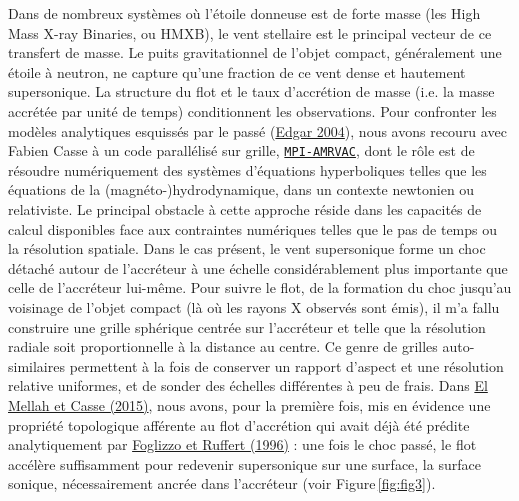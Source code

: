 \documentclass[a4paper,12pt,onecolumn]{article}
\begin{document}
\indent \indent Dans de nombreux systèmes où l'étoile donneuse est de forte masse (les High Mass X-ray Binaries, ou HMXB), le vent stellaire est le principal vecteur de ce transfert de masse. Le puits gravitationnel de l'objet compact, généralement une étoile à neutron, ne capture qu'une fraction de ce vent dense et hautement supersonique. La structure du flot et le taux d'accrétion de masse (i.e. la masse accrétée par unité de temps) conditionnent les observations. Pour confronter les modèles analytiques esquissés par le passé (\href{http://www.sciencedirect.com/science/article/pii/S1387647304000739}{Edgar 2004}), nous avons recouru avec Fabien Casse à un code parallélisé sur grille, \href{http://amrvac.org/}{\texttt{MPI-AMRVAC}}, dont le rôle est de résoudre numériquement des systèmes d'équations hyperboliques telles que les équations de la (magnéto-)hydrodynamique, dans un contexte newtonien ou relativiste. Le principal obstacle à cette approche réside dans les capacités de calcul disponibles face aux contraintes numériques telles que le pas de temps ou la résolution spatiale. Dans le cas présent, le vent supersonique forme un choc détaché autour de l'accréteur à une échelle considérablement plus importante que celle de l'accréteur lui-même. Pour suivre le flot, de la formation du choc jusqu'au voisinage de l'objet compact (là où les rayons X observés sont émis), il m'a fallu construire une grille sphérique centrée sur l'accréteur et telle que la résolution radiale soit proportionnelle à la distance au centre. Ce genre de grilles auto-similaires permettent à la fois de conserver un rapport d'aspect et une résolution relative uniformes, et de sonder des échelles différentes à peu de frais. Dans \href{https://academic.oup.com/mnras/article-abstract/454/3/2657/1206904/Numerical-simulations-of-axisymmetric?redirectedFrom=fulltext}{El Mellah et Casse (2015)}, nous avons, pour la première fois, mis en évidence une propriété topologique afférente au flot d'accrétion qui avait déjà été prédite analytiquement par \href{http://adsabs.harvard.edu/abs/1997A\%26A...320..342F}{Foglizzo et Ruffert (1996)} : une fois le choc passé, le flot accélère suffisamment pour redevenir supersonique sur une surface, la surface sonique, nécessairement ancrée dans l'accréteur (voir Figure\,\ref{fig:fig3}). 
\end{document}
